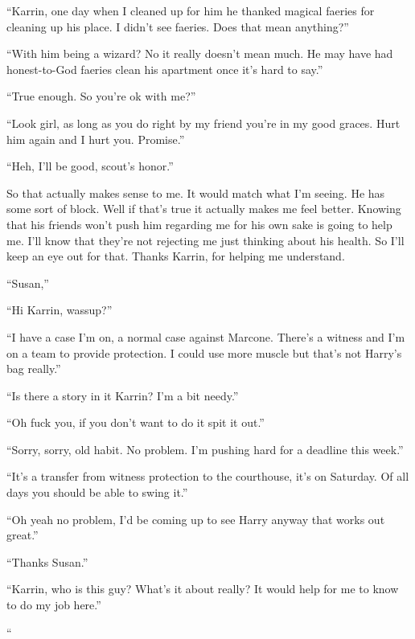 ``Karrin, one day when I cleaned up for him he thanked magical faeries for cleaning up his place. I didn't see faeries. Does that mean anything?''

``With him being a wizard? No it really doesn't mean much. He may have had honest-to-God faeries clean his apartment once it's hard to say.''

``True enough. So you're ok with me?''

``Look girl, as long as you do right by my friend you're in my good graces. Hurt him again and I hurt you. Promise.''

``Heh, I'll be good, scout's honor.''

So that actually makes sense to me. It would match what I'm seeing. He has some sort of block. Well if that's true it actually makes me feel better. Knowing that his friends won't push him regarding me for his own sake is going to help me. I'll know that they're not rejecting me just thinking about his health. So I'll keep an eye out for that. Thanks Karrin, for helping me understand.

\parasep

``Susan,''

``Hi Karrin, wassup?''

``I have a case I'm on, a normal case against Marcone. There's a witness and I'm on a team to provide protection. I could use more muscle but that's not Harry's bag really.''

``Is there a story in it Karrin? I'm a bit needy.''

``Oh fuck you, if you don't want to do it spit it out.''

``Sorry, sorry, old habit. No problem. I'm pushing hard for a deadline this week.''

``It's a transfer from witness protection to the courthouse, it's on Saturday. Of all days you should be able to swing it.''

``Oh yeah no problem, I'd be coming up to see Harry anyway that works out great.''

``Thanks Susan.''

``Karrin, who is this guy? What's it about really? It would help for me to know to do my job here.''

``








